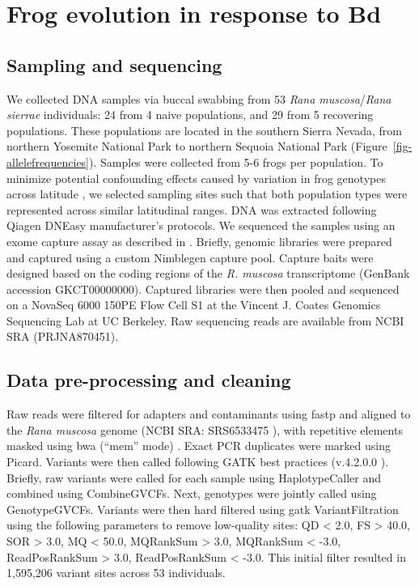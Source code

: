 \documentclass[9pt,twocolumn,twoside,lineno]{pnas-new}
\begin{document}
{\hypertarget{frog-evolution-in-response-to-bd-1}{%
\section*{Frog evolution in response to
Bd}\label{frog-evolution-in-response-to-bd-1}}

\hypertarget{sampling-and-sequencing}{%
\subsection*{Sampling and sequencing}\label{sampling-and-sequencing}}

We collected DNA samples via buccal swabbing \citep{broquet2007} from 53
\emph{Rana muscosa}/\emph{Rana sierrae} individuals: 24 from 4 naive
populations, and 29 from 5 recovering populations. These populations are
located in the southern Sierra Nevada, from northern Yosemite National
Park to northern Sequoia National Park
(Figure~\ref{fig-allelefrequencies}). Samples were collected from 5-6
frogs per population. To minimize potential confounding effects caused
by variation in frog genotypes across latitude \citep{byrne2023}, we
selected sampling sites such that both population types were represented
across similar latitudinal ranges. DNA was extracted following Qiagen
DNEasy manufacturer's protocols. We sequenced the samples using an exome
capture assay as described in \citep{byrne2023}. Briefly, genomic
libraries were prepared and captured using a custom Nimblegen capture
pool. Capture baits were designed based on the coding regions of the
\emph{R. muscosa} transcriptome (GenBank accession GKCT00000000).
Captured libraries were then pooled and sequenced on a NovaSeq 6000
150PE Flow Cell S1 at the Vincent J. Coates Genomics Sequencing Lab at
UC Berkeley. Raw sequencing reads are available from NCBI SRA
(PRJNA870451).

\hypertarget{data-pre-processing-and-cleaning}{%
\subsection*{Data pre-processing and
cleaning}\label{data-pre-processing-and-cleaning}}

Raw reads were filtered for adapters and contaminants using fastp
\citep{chen2018} and aligned to the \emph{Rana muscosa} genome (NCBI
SRA: SRS6533475 \citep{hon2020}), with repetitive elements masked using
bwa (``mem'' mode) \citep{li2013}. Exact PCR duplicates were marked
using Picard. Variants were then called following GATK best practices
(v.4.2.0.0 \citep{van2020}). Briefly, raw variants were called for each
sample using HaplotypeCaller and combined using CombineGVCFs. Next,
genotypes were jointly called using GenotypeGVCFs. Variants were then
hard filtered using gatk VariantFiltration using the following
parameters to remove low-quality sites: QD \textless{} 2.0, FS
\textgreater{} 40.0, SOR \textgreater{} 3.0, MQ \textless{} 50.0,
MQRankSum \textgreater{} 3.0, MQRankSum \textless{} -3.0, ReadPosRankSum
\textgreater{} 3.0, ReadPosRankSum \textless{} -3.0. This initial filter
resulted in 1,595,206 variant sites across 53 individuals.

}
\end{document}
